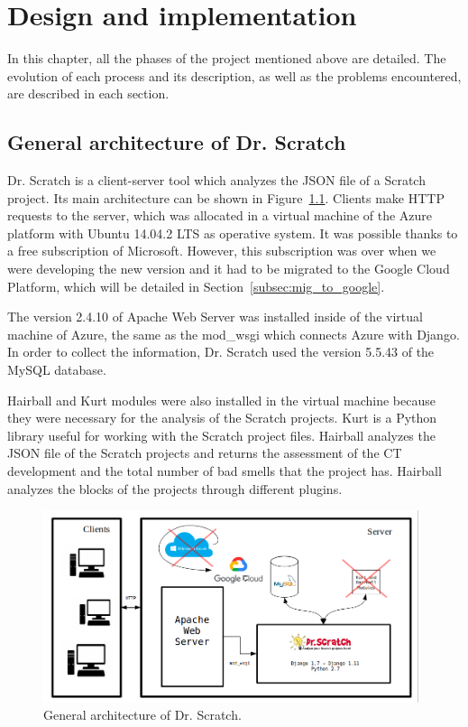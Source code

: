 

\cleardoublepage
\chapter{Design and implementation}
\label{chap:implementation}

In this chapter, all the phases of the project mentioned above are detailed. The evolution of each process and its description, as well as the problems encountered, are described in each section.


\section{General architecture of Dr. Scratch} 
\label{sec:arquitectura}

Dr. Scratch is a client-server tool which analyzes the JSON file of a Scratch project. Its main architecture can be shown in Figure~\ref{fig:architecture}. Clients make HTTP requests to the server, which was allocated in a virtual machine of the Azure platform with Ubuntu 14.04.2 LTS as operative system. It was possible thanks to a free subscription of Microsoft. However, this subscription was over when we were developing the new version and it had to be migrated to the Google Cloud Platform, which will be detailed in Section~\ref{subsec:mig_to_google}. 

The version 2.4.10 of Apache Web Server was installed inside of the virtual machine of Azure, the same as the mod\_wsgi which connects Azure with Django. In order to collect the information, Dr. Scratch used the version 5.5.43 of the MySQL database. 

Hairball and Kurt modules were also installed in the virtual machine because they were necessary for the analysis of the Scratch projects. Kurt is a Python library useful for working with the Scratch project files. Hairball analyzes the JSON file of the Scratch projects and returns the assessment of the CT development and the total number of bad smells that the project has. Hairball analyzes the blocks of the projects through different plugins.

 \begin{figure}
    \centering
    \includegraphics[width=11cm,                         keepaspectratio]{img/Client_Server.png}
    \caption{General architecture of Dr. Scratch.}
    \label{fig:architecture}
\end{figure}


